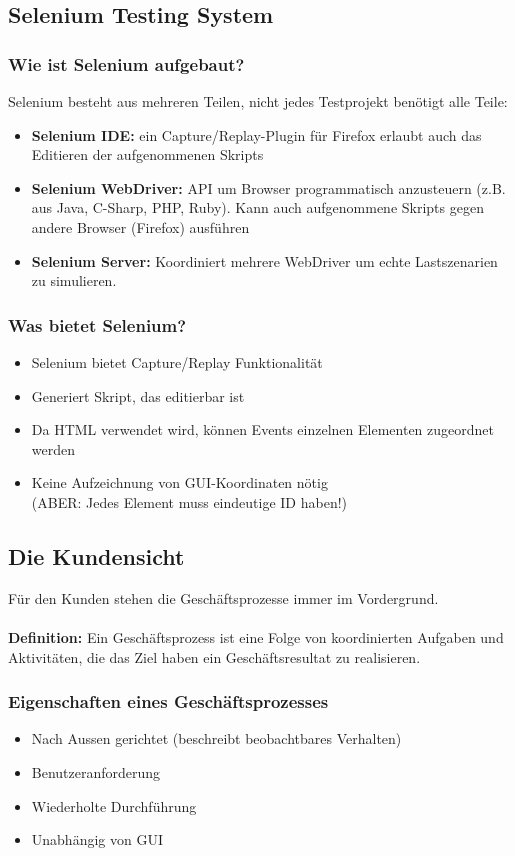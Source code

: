 \documentclass[a4paper,10pt]{article}
\newcommand{\Bold}[1]{\textbf{#1}} %
\begin{document}
\subsection{Selenium Testing System}
\subsubsection{Wie ist Selenium aufgebaut?}
Selenium besteht aus mehreren Teilen, nicht jedes Testprojekt benötigt alle Teile:
\begin{itemize}
\item \textbf{\Bold Selenium IDE:} ein Capture/Replay-Plugin für Firefox erlaubt auch das Editieren der aufgenommenen Skripts
\item \textbf{\Bold Selenium WebDriver:} API um Browser programmatisch anzusteuern (z.B. aus Java, C-Sharp, PHP, Ruby). Kann auch aufgenommene Skripts gegen andere Browser (Firefox) ausführen
\item \textbf{\Bold Selenium Server:} Koordiniert mehrere WebDriver um echte Lastszenarien zu simulieren.

\end{itemize}

\subsubsection{Was bietet Selenium?}
\begin{itemize}
\item Selenium bietet Capture/Replay Funktionalität
\item Generiert Skript, das editierbar ist
\item Da HTML verwendet wird, können Events einzelnen Elementen zugeordnet werden
\item Keine Aufzeichnung von GUI-Koordinaten nötig\\
(ABER: Jedes Element muss eindeutige ID haben!)
\end{itemize}

\subsection{Die Kundensicht}
Für den Kunden stehen die Geschäftsprozesse immer im Vordergrund.\\\\
\textbf{\Bold Definition:} Ein Geschäftsprozess ist eine Folge von koordinierten Aufgaben und Aktivitäten, die das Ziel haben ein Geschäftsresultat zu realisieren.

\subsubsection{Eigenschaften eines Geschäftsprozesses}
\begin{itemize}
\item Nach Aussen gerichtet (beschreibt beobachtbares Verhalten)
\item Benutzeranforderung
\item Wiederholte Durchführung
\item Unabhängig von GUI
\end{itemize}
\end{document}

